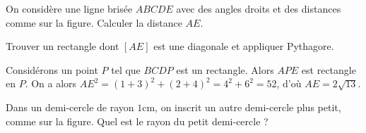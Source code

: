 \begin{exo}
On considère une ligne brisée $ABCDE$ avec des angles droits et des distances comme sur la figure.
Calculer la distance $AE$.
\begin{center}
\end{center}
\begin{hint}
Trouver un rectangle dont $[AE]$ est une diagonale et appliquer Pythagore.
\end{hint}
\begin{sol}
Considérons un point $P$ tel que $BCDP$ est un rectangle. Alors $APE$ est rectangle en $P$.
On a alors $AE^2 = (1+3)^2+(2+4)^2=4^2+6^2=52$, d'où $AE=2\sqrt{13}$.
\end{sol}
\end{exo}




\begin{exo}
Dans un demi-cercle de rayon $1$cm, on inscrit un autre demi-cercle plus petit, comme sur la figure.
Quel est le rayon du petit demi-cercle ?
\begin{center}
\end{center}
\end{exo}



